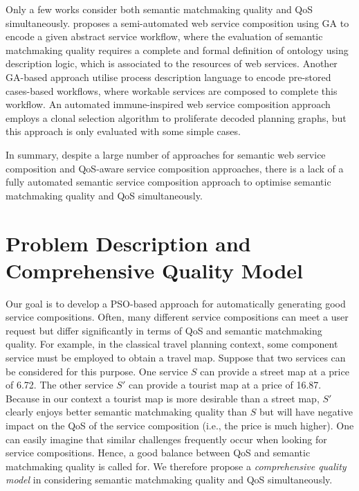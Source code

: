 \documentclass{llncs}
\begin{document}
Only a few works \cite{fanjiang2014semantic,lecue2009optimizing,pop2009immune} consider both semantic matchmaking quality and QoS simultaneously. \cite{lecue2009optimizing} proposes a semi-automated web service composition using GA to encode a given abstract service workflow, where the evaluation of semantic matchmaking quality requires a complete and formal definition of ontology using description logic, which is associated to the resources of web services. Another GA-based approach \cite{fanjiang2014semantic} utilise process description language to encode pre-stored cases-based workflows, where workable services are composed to complete this workflow. An automated immune-inspired web service composition approach \cite{pop2009immune} employs a clonal selection algorithm to proliferate decoded planning graphs, but this approach is only evaluated with some simple cases.

In summary, despite a large number of approaches for semantic web service composition and QoS-aware service composition approaches, there is a lack of a fully automated semantic service composition approach to optimise semantic matchmaking quality and QoS simultaneously. 
\vspace{-0.3cm}

\section{Problem Description and Comprehensive Quality Model}\label{problemDes}

Our goal is to develop a PSO-based approach for automatically generating good service compositions. Often, many different service compositions can meet a user request but differ significantly in terms of QoS and semantic matchmaking quality. For example, in the classical travel planning context, some component service must be employed to obtain a travel map. Suppose that two services can be considered for this purpose. One service $S$ can provide a street map at a price of 6.72. The other service $S'$ can provide a tourist map at a price of 16.87. Because in our context a tourist map is more desirable than a street map, $S'$ clearly enjoys better semantic matchmaking quality than $S$ but will have negative impact on the QoS of the service composition (i.e., the price is much higher). One can easily imagine that similar challenges frequently occur when looking for service compositions. Hence, a good balance between QoS and semantic matchmaking quality is called for. We therefore propose a \emph{comprehensive quality model} in considering semantic matchmaking quality and QoS simultaneously.
\end{document}
